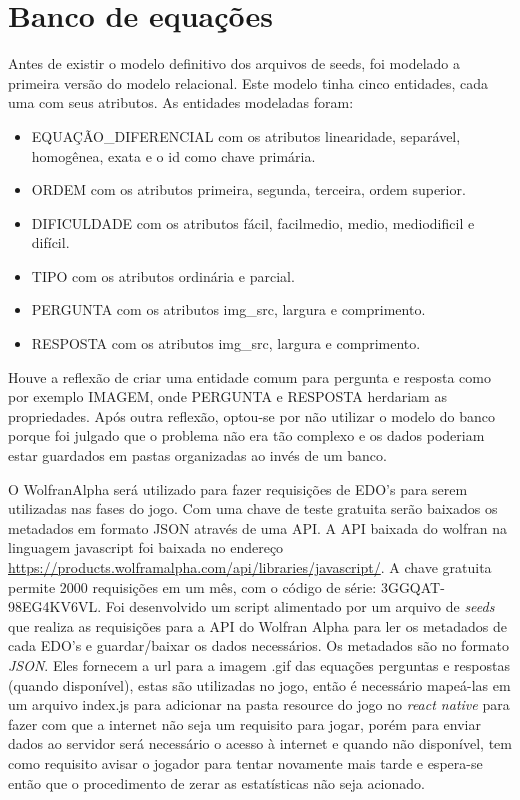 \section[Banco de equações]{Banco de equações}

Antes de existir o modelo definitivo dos arquivos de seeds, foi modelado a primeira versão do modelo relacional.
Este modelo tinha cinco entidades, cada uma com seus atributos. As entidades modeladas foram: 
\begin{itemize}
	\item EQUAÇÃO\_DIFERENCIAL com os atributos linearidade, separável, homogênea, exata e o id como chave primária.
	\item ORDEM com os atributos primeira, segunda, terceira, ordem superior.
	\item DIFICULDADE com os atributos fácil, facilmedio, medio, mediodificil e difícil.
	\item TIPO com os atributos ordinária e parcial.
	\item PERGUNTA com os atributos img\_src, largura e comprimento.
	\item RESPOSTA com os atributos img\_src, largura e comprimento.
\end{itemize}

Houve a reflexão de criar uma entidade comum para pergunta e resposta como por exemplo IMAGEM, onde PERGUNTA e RESPOSTA herdariam as propriedades. Após outra reflexão, optou-se por não utilizar o modelo do banco porque foi julgado que o problema não era tão complexo e os dados poderiam estar guardados em pastas organizadas ao invés de um banco.

O WolfranAlpha será utilizado para fazer requisições de EDO's para serem utilizadas nas fases do jogo. Com uma chave de teste gratuita serão baixados os metadados em formato JSON através de uma API.
A API baixada do wolfran na linguagem javascript foi baixada no endereço \url{https://products.wolframalpha.com/api/libraries/javascript/}.
A chave gratuita permite 2000 requisições em um mês, com o código de série: 3GGQAT-98EG4KV6VL. Foi desenvolvido um script alimentado por um arquivo de \textit{seeds} que realiza as requisições para a API do Wolfran Alpha para ler os metadados de cada EDO's e guardar/baixar os dados necessários. Os metadados são no formato \textit{JSON}. Eles fornecem a url para a imagem .gif das equações perguntas e respostas (quando disponível), estas são utilizadas no jogo, então é necessário mapeá-las em um arquivo index.js para adicionar na pasta resource do jogo no \textit{react native} para fazer com que a internet não seja um requisito para jogar, porém para enviar dados ao servidor será necessário o acesso à internet e quando não disponível, tem como requisito avisar o jogador para tentar novamente mais tarde e espera-se então que o procedimento de zerar as estatísticas não seja acionado.


